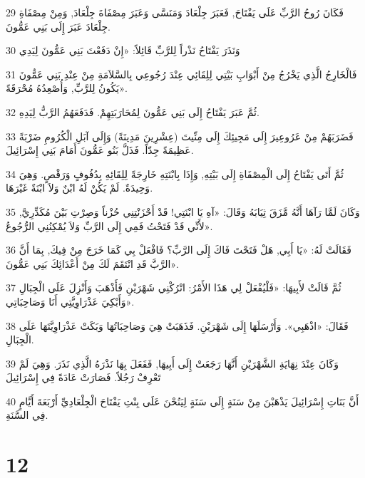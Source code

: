 \par 29 فَكَانَ رُوحُ الرَّبِّ عَلَى يَفْتَاحَ, فَعَبَرَ جِلْعَادَ وَمَنَسَّى وَعَبَرَ مِصْفَاةَ جِلْعَادَ, وَمِنْ مِصْفَاةِ جِلْعَادَ عَبَرَ إِلَى بَنِي عَمُّونَ.
\par 30 وَنَذَرَ يَفْتَاحُ نَذْراً لِلرَّبِّ قَائِلاً: «إِنْ دَفَعْتَ بَنِي عَمُّونَ لِيَدِي
\par 31 فَالْخَارِجُ الَّذِي يَخْرُجُ مِنْ أَبْوَابِ بَيْتِي لِلِقَائِي عِنْدَ رُجُوعِي بِالسَّلاَمَةِ مِنْ عِنْدِ بَنِي عَمُّونَ يَكُونُ لِلرَّبِّ, وَأُصْعِدُهُ مُحْرَقَةً».
\par 32 ثُمَّ عَبَرَ يَفْتَاحُ إِلَى بَنِي عَمُّونَ لِمُحَارَبَتِهِمْ. فَدَفَعَهُمُ الرَّبُّ لِيَدِهِ.
\par 33 فَضَرَبَهُمْ مِنْ عَرُوعِيرَ إِلَى مَجِيئِكَ إِلَى مِنِّيتَ (عِشْرِينَ مَدِينَةً) وَإِلَى آبَلِ الْكُرُومِ ضَرْبَةً عَظِيمَةً جِدّاً. فَذَلَّ بَنُو عَمُّونَ أَمَامَ بَنِي إِسْرَائِيلَ.
\par 34 ثُمَّ أَتَى يَفْتَاحُ إِلَى الْمِصْفَاةِ إِلَى بَيْتِهِ, وَإِذَا بِابْنَتِهِ خَارِجَةً لِلِقَائِهِ بِدُفُوفٍ وَرَقْصٍ. وَهِيَ وَحِيدَةٌ. لَمْ يَكُنْ لَهُ ابْنٌ وَلاَ ابْنَةٌ غَيْرَهَا.
\par 35 وَكَانَ لَمَّا رَآهَا أَنَّهُ مَّزَقَ ثِيَابَهُ وَقَالَ: «آهِ يَا ابْنَتِي! قَدْ أَحْزَنْتِنِي حُزْناً وَصِرْتِ بَيْنَ مُكَدِّرِيَّ, لأَنِّي قَدْ فَتَحْتُ فَمِي إِلَى الرَّبِّ وَلاَ يُمْكِنُنِي الرُّجُوعُ».
\par 36 فَقَالَتْ لَهُ: «يَا أَبِي, هَلْ فَتَحْتَ فَاكَ إِلَى الرَّبِّ؟ فَافْعَلْ بِي كَمَا خَرَجَ مِنْ فِيكَ, بِمَا أَنَّ الرَّبَّ قَدِ انْتَقَمَ لَكَ مِنْ أَعْدَائِكَ بَنِي عَمُّونَ».
\par 37 ثُمَّ قَالَتْ لأَبِيهَا: «فَلْيُفْعَلْ لِي هَذَا الأَمْرُ: اتْرُكْنِي شَهْرَيْنِ فَأَذْهَبَ وَأَنْزِلَ عَلَى الْجِبَالِ وَأَبْكِيَ عَذْرَاوِيَّتِي أَنَا وَصَاحِبَاتِي».
\par 38 فَقَالَ: «اذْهَبِي». وَأَرْسَلَهَا إِلَى شَهْرَيْنِ. فَذَهَبَتْ هِيَ وَصَاحِبَاتُهَا وَبَكَتْ عَذْرَاوِيَّتَهَا عَلَى الْجِبَالِ.
\par 39 وَكَانَ عِنْدَ نِهَايَةِ الشَّهْرَيْنِ أَنَّهَا رَجَعَتْ إِلَى أَبِيهَا, فَفَعَلَ بِهَا نَذْرَهُ الَّذِي نَذَرَ. وَهِيَ لَمْ تَعْرِفْ رَجُلاً. فَصَارَتْ عَادَةً فِي إِسْرَائِيلَ
\par 40 أَنَّ بَنَاتِ إِسْرَائِيلَ يَذْهَبْنَ مِنْ سَنَةٍ إِلَى سَنَةٍ لِيَنُحْنَ عَلَى بِنْتِ يَفْتَاحَ الْجِلْعَادِيِّ أَرْبَعَةَ أَيَّامٍ فِي السَّنَةِ.

\chapter{12}

